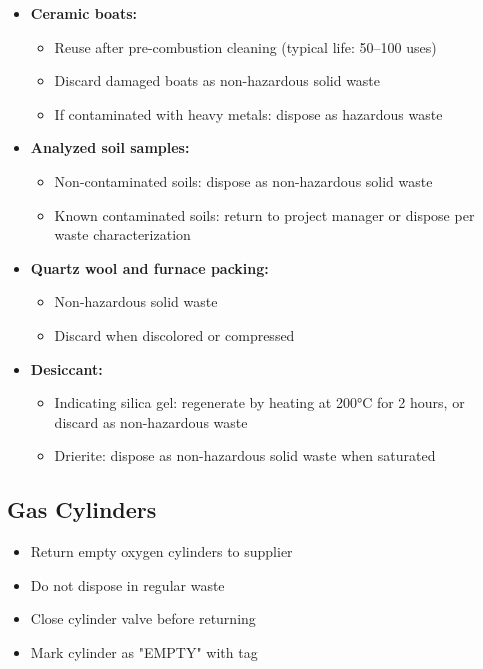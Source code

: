 \documentclass[11pt,a4paper]{article}\usepackage[]{graphicx}\usepackage[]{xcolor}
\begin{document}
\begin{itemize}[noitemsep]
    \item \textbf{Ceramic boats:}
    \begin{itemize}
        \item Reuse after pre-combustion cleaning (typical life: 50--100 uses)
        \item Discard damaged boats as non-hazardous solid waste
        \item If contaminated with heavy metals: dispose as hazardous waste
    \end{itemize}
    \item \textbf{Analyzed soil samples:}
    \begin{itemize}
        \item Non-contaminated soils: dispose as non-hazardous solid waste
        \item Known contaminated soils: return to project manager or dispose per waste characterization
    \end{itemize}
    \item \textbf{Quartz wool and furnace packing:}
    \begin{itemize}
        \item Non-hazardous solid waste
        \item Discard when discolored or compressed
    \end{itemize}
    \item \textbf{Desiccant:}
    \begin{itemize}
        \item Indicating silica gel: regenerate by heating at 200°C for 2 hours, or discard as non-hazardous waste
        \item Drierite: dispose as non-hazardous solid waste when saturated
    \end{itemize}
\end{itemize}

\subsection{Gas Cylinders}

\begin{itemize}[noitemsep]
    \item Return empty oxygen cylinders to supplier
    \item Do not dispose in regular waste
    \item Close cylinder valve before returning
    \item Mark cylinder as "EMPTY" with tag
\end{itemize}
\end{document}
